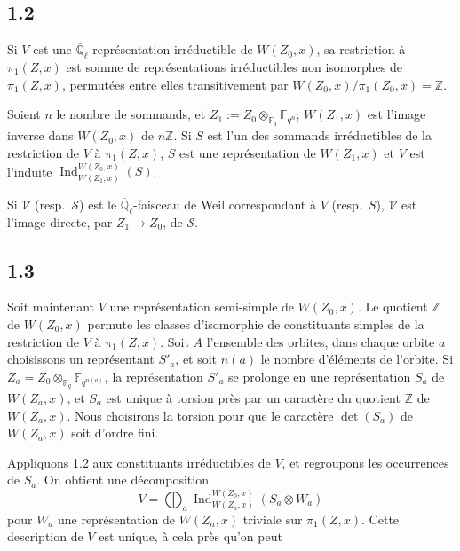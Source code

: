 \documentclass[11pt,a4paper]{article}
\theoremstyle{plain}
\theoremstyle{definition}
\DeclareMathOperator{\Ind}{Ind}
\begin{document}
\subsection*{1.2}

Si $V$ est une $\overline{\mathbb{Q}}_\ell$-repr\'esentation irr\'eductible de $W(Z_0,x)$, sa restriction \`a $\pi_1(Z,x)$ est somme de repr\'esentations irr\'eductibles non isomorphes de $\pi_1(Z,x)$, permut\'ees entre elles transitivement par $W(Z_0,x)/\pi_1(Z_0,x) = \mathbb{Z}$.

Soient $n$ le nombre de sommands, et $Z_1 := Z_0 \otimes_{\mathbb{F}_q} \mathbb{F}_{q^n}$; $W(Z_1,x)$ est l'image inverse dans $W(Z_0,x)$ de $n\mathbb{Z}$. Si $S$ est l'un des sommands irr\'eductibles de la restriction de $V$ \`a $\pi_1(Z,x)$, $S$ est une repr\'esentation de $W(Z_1,x)$ et $V$ est l'induite $\Ind_{W(Z_1,x)}^{W(Z_0,x)}(S)$.

Si $\mathcal{V}$ (resp.~$\mathcal{S}$) est le $\overline{\mathbb{Q}}_\ell$-faisceau de Weil correspondant \`a $V$ (resp.~$S$), $\mathcal{V}$ est l'image directe, par $Z_1 \to Z_0$, de $\mathcal{S}$.

\subsection*{1.3}

Soit maintenant $V$ une repr\'esentation semi-simple de $W(Z_0,x)$. Le quotient $\mathbb{Z}$ de $W(Z_0,x)$ permute les classes d'isomorphie de constituants simples de la restriction de $V$ \`a $\pi_1(Z,x)$. Soit $A$ l'ensemble des orbites, dans chaque orbite $a$ choisissons un repr\'esentant $S'_a$, et soit $n(a)$ le nombre d'\'el\'ements de l'orbite. Si $Z_a = Z_0 \otimes_{\mathbb{F}_q} \mathbb{F}_{q^{n(a)}}$, la repr\'esentation $S'_a$ se prolonge en une repr\'esentation $S_a$ de $W(Z_a,x)$, et $S_a$ est unique \`a torsion pr\`es par un caract\`ere du quotient $\mathbb{Z}$ de $W(Z_a,x)$. Nous choisirons la torsion pour que le caract\`ere $\det(S_a)$ de $W(Z_a,x)$ soit d'ordre fini.

Appliquons 1.2 aux constituants irr\'eductibles de $V$, et regroupons les occurrences de $S_a$. On obtient une d\'ecomposition
\begin{equation}\label{eq:1.3.1}
V = \bigoplus_a \Ind_{W(Z_a,x)}^{W(Z_0,x)}(S_a \otimes W_a)
\end{equation}
pour $W_a$ une repr\'esentation de $W(Z_a,x)$ triviale sur $\pi_1(Z,x)$. Cette description de $V$ est unique, \`a cela pr\`es qu'on peut
\end{document}
